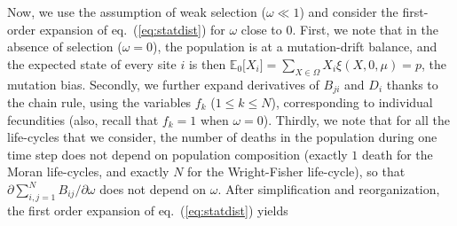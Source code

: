 \documentclass[11pt, letterpaper]{article}
\renewcommand{\eqref}[1]{\textup{{\normalfont eq.~(\ref{#1}}\normalfont)}}
\newcommand{\deriv}[2]{\partial_{#2}\!{#1}\,}
\newcommand{\Espzero}[1]{\mathbb{E}_0\big[ #1\big]}%
\newcommand{\bigO}[1]{O\left( #1 \right)}
\begin{document}
Now, we use the assumption of weak selection ($\omega \ll 1$) and consider the first-order expansion of \eqref{eq:statdist} for $\omega$ close to $0$. First, we note that in the absence of selection ($\omega = 0$), the population is at a mutation-drift balance, and the expected state of every site $i$ is then $\Espzero{X_i} = \sum_{X\in \Omega} X_i \xi(X, 0, \mu)= p$, the mutation bias. Secondly, we further expand derivatives of $B_{ji}$ and $D_i$ thanks to the chain rule, using the variables $f_k$ ($1\leq k \leq N$), corresponding to individual fecundities (also, recall that $f_k=1$ when $\omega=0$). Thirdly, we note that for all the life-cycles that we consider, the number of deaths in the population during one time step does not depend on population composition (exactly $1$ death for the Moran life-cycles, and exactly $N$ for the Wright-Fisher life-cycle), so that $\partial\sum_{i,j=1}^N B_{ij}/\partial \omega$ does not depend on $\omega$. 
After simplification and reorganization, the first order expansion of \eqref{eq:statdist} yields
%
\end{document}
